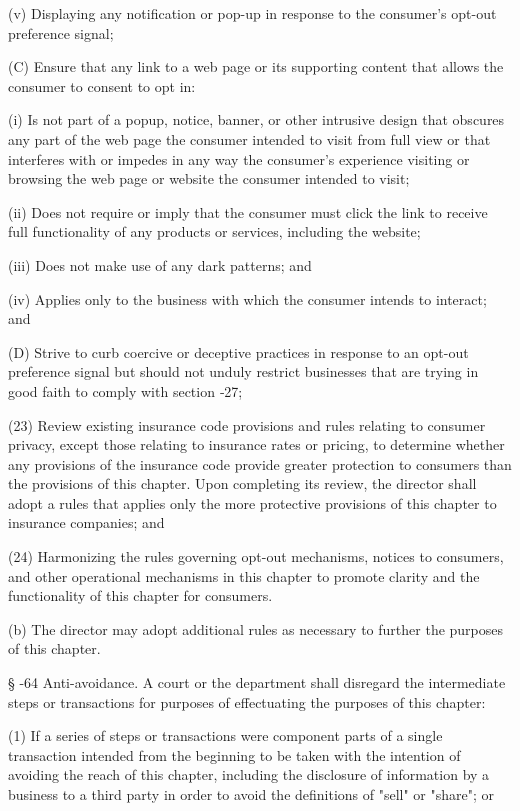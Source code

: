                (v)  Displaying any notification or pop-up in response to the consumer's opt-out preference signal;

          (C)  Ensure that any link to a web page or its supporting content that allows the consumer to consent to opt in:

               (i)  Is not part of a popup, notice, banner, or other intrusive design that obscures any part of the web page the consumer intended to visit from full view or that interferes with or impedes in any way the consumer's experience visiting or browsing the web page or website the consumer intended to visit;

              (ii)  Does not require or imply that the consumer must click the link to receive full functionality of any products or services, including the website;

             (iii)  Does not make use of any dark patterns; and

              (iv)  Applies only to the business with which the consumer intends to interact; and

          (D)  Strive to curb coercive or deceptive practices in response to an opt-out preference signal but should not unduly restrict businesses that are trying in good faith to comply with section    ‑27;

    (23)  Review existing insurance code provisions and rules relating to consumer privacy, except those relating to insurance rates or pricing, to determine whether any provisions of the insurance code provide greater protection to consumers than the provisions of this chapter.  Upon completing its review, the director shall adopt a rules that applies only the more protective provisions of this chapter to insurance companies; and

    (24)  Harmonizing the rules governing opt-out mechanisms, notices to consumers, and other operational mechanisms in this chapter to promote clarity and the functionality of this chapter for consumers.

     (b)  The director may adopt additional rules as necessary to further the purposes of this chapter.

     §   -64  Anti-avoidance.  A court or the department shall disregard the intermediate steps or transactions for purposes of effectuating the purposes of this chapter:

     (1)  If a series of steps or transactions were component parts of a single transaction intended from the beginning to be taken with the intention of avoiding the reach of this chapter, including the disclosure of information by a business to a third party in order to avoid the definitions of "sell" or "share"; or


